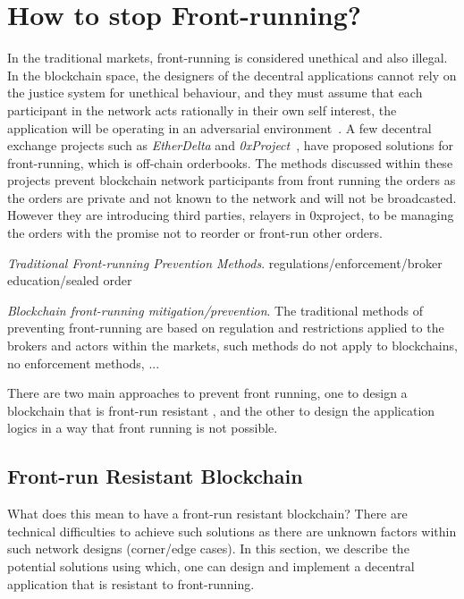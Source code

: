 



\section{How to stop Front-running?}
In the traditional markets, front-running is considered unethical and also illegal. In the blockchain space, the designers of the decentral applications cannot rely on the justice system for unethical behaviour, and they must assume that each participant in the network acts rationally in their own self interest, the application will be operating in an adversarial environment~\cite{0xfrontrunning:online}.
A few decentral exchange projects such as \textit{EtherDelta} and \textit{0xProject}~\cite{warren20170x}, have proposed solutions for front-running, which is off-chain orderbooks. The methods discussed within these projects prevent blockchain network participants from front running the orders as the orders are private and not known to the network and will not be broadcasted. However they are introducing third parties, \eg relayers in 0xproject, to be managing the orders with the promise not to reorder or front-run other orders. 

\emph{Traditional Front-running Prevention Methods}. regulations/enforcement/broker education/sealed order


\emph{Blockchain front-running mitigation/prevention}. The traditional methods of preventing front-running are based on regulation and restrictions applied to the brokers and actors within the markets, such methods do not apply to blockchains, no enforcement methods, ... 

There are two main approaches to prevent front running, one to design a blockchain that is front-run resistant , and the other to design the application logics in a way that front running is not possible. 


\subsection{Front-run Resistant Blockchain}
What does this mean to have a front-run resistant blockchain?  There are technical difficulties to achieve such solutions as there are unknown factors within such network designs (corner/edge cases). In this section, we describe the potential solutions using which, one can design and implement a decentral application that is resistant to front-running.

